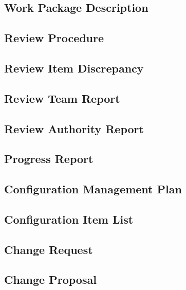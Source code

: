 \subsection{Work Package Description}
\label{sec:Work Package Description}


\subsection{Review Procedure}
\label{sec:Review Procedure}


\subsection{Review Item Discrepancy}
\label{sec:Review Item Discrepancy}


\subsection{Review Team Report}
\label{sec:Review Team Report}


\subsection{Review Authority Report}
\label{sec:Review Authority Report}


\subsection{Progress Report}
\label{sec:Progress Report}


\subsection{Configuration Management Plan}
\label{sec:Configuration Management Plan}


\subsection{Configuration Item List}
\label{sec:Configuration Item List}


\subsection{Change Request}
\label{sec:Change Request}


\subsection{Change Proposal}
\label{sec:Change Proposal}


